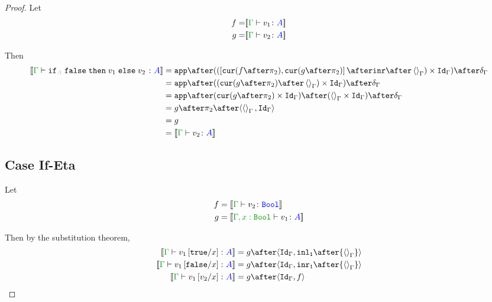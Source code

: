 \documentclass{report}
\begin{document}
\begin{framed}
\begin{proof}
        
        Let
        \begin{align*}
            f = &\deno{\gtyperelation{v_1}{ A}}\\
            g = &\deno{\gtyperelation{v_2}{ A}}\\
        \end{align*}
        
        Then
        \begin{equation}
            \begin{split}
                \deno{\gtyperelation{\pifthenelse{A}{\f}{v_1}{v_2}}{ A}} & = \ifMorph{\inr\after\term{\G}}{f}{g} \\
                & = \app\after((\cur{g\after\pp}\after\term{\G})\times\idg)\after\diag{\G}\\
                & = \app\after(\cur{g\after\pp}\times\idg)\after(\term{\G}\times\idg)\after\diag{\G}\\
                & = g\after\pp\after\pr{\term{\G}}{\idg}\\
                & = g \\
                & = \deno{\gtyperelation{v_2}{ A}}\\
            \end{split}
        \end{equation}
        
        \subsection{Case If-Eta}
            Let 
            \begin{align*}
                f & = \deno{\typerelation{\G}{v_2}{\B}} \\
                g & = \deno{\typerelation{\G, x: \B}{v_1}{ A}} \\
            \end{align*}
        
        
            Then by the substitution theorem,
            \begin{align*}
                \deno{\typerelation{\G}{v_1\ssub{x}{\t}}{ A}} & = g\after\pr{\idg}{\inl_\1\after{\term{\G}}}\\
                \deno{\typerelation{\G}{v_1\ssub{x}{\f}}{ A}} & = g\after\pr{\idg}{\inr_\1\after{\term{\G}}}\\
                \deno{\gtyperelation{v_1\ssub{x}{v_2}}{ A}} & = g\after\pr{\idg}{f}
            \end{align*}
        

\end{proof}
\end{framed}
\end{document}
